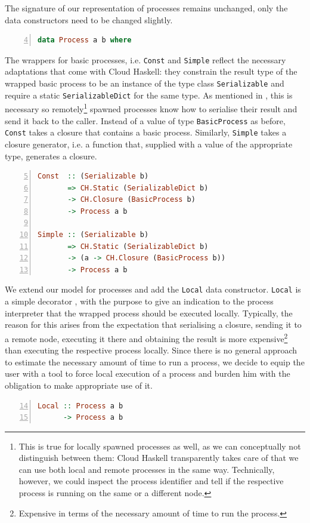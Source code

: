 The signature of our representation of processes remains unchanged, only the data constructors need to be changed slightly.
\begin{lstlisting}[language=Haskell,caption=Data type for the representation of processes.,label=fig:distributed_datatypes,numbers=left,frame=bt,firstnumber=4]
data Process a b where
\end{lstlisting}

The wrappers for basic processes, i.e. \texttt{Const} and \texttt{Simple} reflect the necessary adaptations that come with \textsf{Cloud Haskell}: they constrain the result type of the wrapped basic process to be an instance of the type class \texttt{Serializable} and require a static \texttt{SerializableDict} for the same type. As mentioned in , this is necessary so remotely\footnote{This is true for locally spawned processes as well, as we can conceptually not distinguish between them: \textsf{Cloud Haskell} transparently takes care of that we can use both local and remote processes in the same way. Technically, however, we could inspect the process identifier and tell if the respective process is running on the same or a different node.} spawned processes know how to serialise their result and send it back to the caller. Instead of a value of type \texttt{BasicProcess} as before, \texttt{Const} takes a closure that contains a basic process. Similarly, \texttt{Simple} takes a closure generator, i.e. a function that, supplied with a value of the appropriate type, generates a closure. %
\begin{lstlisting}[language=Haskell,caption=Signature of the \texttt{Const} and \texttt{Simple} data constructors.,numbers=left,frame=bt,firstnumber=5]
Const  :: (Serializable b) 
       => CH.Static (SerializableDict b)
       -> CH.Closure (BasicProcess b)
       -> Process a b

Simple :: (Serializable b)
       => CH.Static (SerializableDict b)
       -> (a -> CH.Closure (BasicProcess b))
       -> Process a b
\end{lstlisting}

We extend our model for processes and add the \texttt{Local} data constructor. \texttt{Local} is a simple decorator \cite{Gamma:1995:DPE:186897}, with the purpose to give an indication to the process interpreter that the wrapped process should be executed locally. Typically, the reason for this arises from the expectation that serialising a closure, sending it to a remote node, executing it there and obtaining the result is more expensive\footnote{Expensive in terms of the necessary amount of time to run the process.} than executing the respective process locally. Since there is no general approach to estimate the necessary amount of time to run a process, we decide to equip the user with a tool to force local execution of a process and burden him with the obligation to make appropriate use of it.
\begin{lstlisting}[language=Haskell,caption=Signature of the additional \texttt{Local} data constructor.,numbers=left,frame=bt,firstnumber=14]
Local :: Process a b
      -> Process a b
\end{lstlisting}


